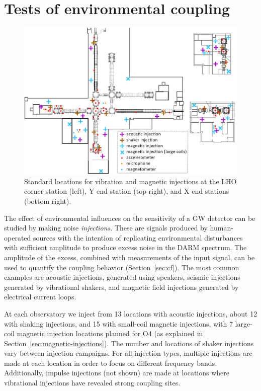 \section{Tests of environmental coupling}\label{subsec:injections}

\begin{figure}[h!]
	\centering
	\includegraphics[width=\textwidth]{figures/injection-map.png}
	\caption{
		Standard locations for vibration and magnetic injections at the LHO corner station (left), Y end station (top right), and X end stations (bottom right).}
	\label{fig:injection_map}
\end{figure}

The effect of environmental influences on the sensitivity of a \ac{GW} detector can be studied by making noise \textit{injections}.
These are signals produced by human-operated sources with the intention of replicating environmental disturbances with sufficient amplitude to produce excess noise in the \ac{DARM} spectrum.
The amplitude of the excess, combined with measurements of the input signal, can be used to quantify the coupling behavior (Section~\ref{sec:cf}).
The most common examples are acoustic injections, generated using speakers, seismic injections generated by vibrational shakers, and magnetic field injections generated by electrical current loops.

At each observatory we inject from 13 locations with acoustic injections, about 12 with shaking injections, and 15 with small-coil magnetic injections, with 7 large-coil magnetic injection locations planned for \ac{O4} (as explained in Section~\ref{sec:magnetic-injections}).
The number and locations of shaker injections vary between injection campaigns. For all injection types, multiple injections are made at each location in order to focus on different frequency bands.
Additionally, impulse injections (not shown) are made at locations where vibrational injections have revealed strong coupling sites.

